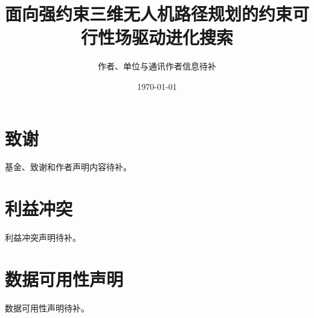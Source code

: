 \documentclass[UTF8,letterpaper,zihao=5,twocolumn]{ctexart}
\title{面向强约束三维无人机路径规划的约束可行性场驱动进化搜索}
\author{作者、单位与通讯作者信息待补}
\date{\today}
\begin{document}
\maketitle








\section*{致谢}
基金、致谢和作者声明内容待补。

\section*{利益冲突}
利益冲突声明待补。

\section*{数据可用性声明}
数据可用性声明待补。



\end{document}
